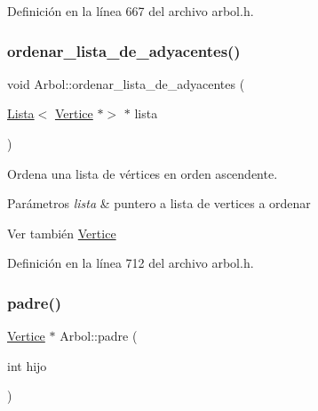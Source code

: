 Definición en la línea 667 del archivo arbol.\+h.

\mbox{\label{classArbol_aeb7dff584795382d8e8a1a4694d0ac4e}} 
\subsubsection{\texorpdfstring{ordenar\+\_\+lista\+\_\+de\+\_\+adyacentes()}{ordenar\_lista\_de\_adyacentes()}}
{\footnotesize\ttfamily void Arbol\+::ordenar\+\_\+lista\+\_\+de\+\_\+adyacentes (\begin{DoxyParamCaption}\item[{\hyperlink{classLista}{Lista}$<$ \hyperlink{classVertice}{Vertice} $\ast$$>$ $\ast$}]{lista }\end{DoxyParamCaption})\hspace{0.3cm}{\ttfamily [protected]}}



Ordena una lista de vértices en orden ascendente. 


\begin{DoxyParams}{Parámetros}
{\em lista} & puntero a lista de vertices a ordenar \\
\hline
\end{DoxyParams}
\begin{DoxySeeAlso}{Ver también}
\hyperlink{classVertice}{Vertice} 
\end{DoxySeeAlso}


Definición en la línea 712 del archivo arbol.\+h.

\mbox{\label{classArbol_abcb8c26e9021a1418de71ad6014351cf}} 
\subsubsection{\texorpdfstring{padre()}{padre()}\hspace{0.1cm}{\footnotesize\ttfamily [1/3]}}
{\footnotesize\ttfamily \hyperlink{classVertice}{Vertice} $\ast$ Arbol\+::padre (\begin{DoxyParamCaption}\item[{int}]{hijo }\end{DoxyParamCaption})}



